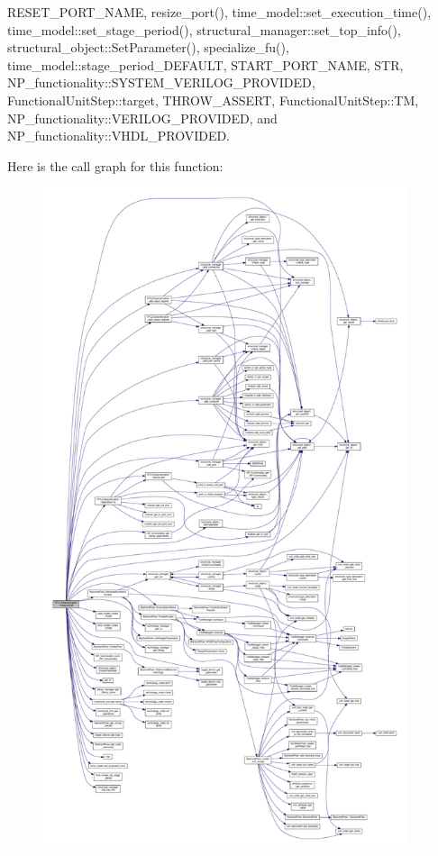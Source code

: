R\+E\+S\+E\+T\+\_\+\+P\+O\+R\+T\+\_\+\+N\+A\+ME, resize\+\_\+port(), time\+\_\+model\+::set\+\_\+execution\+\_\+time(), time\+\_\+model\+::set\+\_\+stage\+\_\+period(), structural\+\_\+manager\+::set\+\_\+top\+\_\+info(), structural\+\_\+object\+::\+Set\+Parameter(), specialize\+\_\+fu(), time\+\_\+model\+::stage\+\_\+period\+\_\+\+D\+E\+F\+A\+U\+LT, S\+T\+A\+R\+T\+\_\+\+P\+O\+R\+T\+\_\+\+N\+A\+ME, S\+TR, N\+P\+\_\+functionality\+::\+S\+Y\+S\+T\+E\+M\+\_\+\+V\+E\+R\+I\+L\+O\+G\+\_\+\+P\+R\+O\+V\+I\+D\+ED, Functional\+Unit\+Step\+::target, T\+H\+R\+O\+W\+\_\+\+A\+S\+S\+E\+RT, Functional\+Unit\+Step\+::\+TM, N\+P\+\_\+functionality\+::\+V\+E\+R\+I\+L\+O\+G\+\_\+\+P\+R\+O\+V\+I\+D\+ED, and N\+P\+\_\+functionality\+::\+V\+H\+D\+L\+\_\+\+P\+R\+O\+V\+I\+D\+ED.

Here is the call graph for this function\+:
\nopagebreak
\begin{figure}[H]
\begin{center}
\leavevmode
\includegraphics[height=550pt]{d9/d84/classRTLCharacterization_a61ddc1e36acd32ca894f84303206ff47_cgraph}
\end{center}
\end{figure}
\mbox{\label{classRTLCharacterization_a4a947126e0eb8dd4eb164887a252d597}} 
